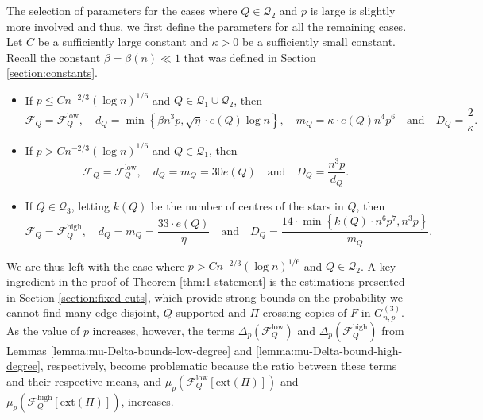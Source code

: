 \documentclass[11pt,a4paper,oneside,reqno]{amsart}
\newcommand{\Gnp}{G_{n, p}^{(3)}}
\newcommand{\cC}{\mathcal{C}}
\newcommand{\cF}{\mathcal{F}}
\newcommand{\cQ}{\mathcal{Q}}
\newcommand{\1}{\mathbbm{1}} %
\renewcommand{\le}{\leqslant}
\newcommand{\cFQL}{\cF_Q^{\mathrm{low}}}
\newcommand{\cFQH}{\cF_Q^{\mathrm{high}}}
\newcommand{\cTFQH}{\Tilde{\cF}_Q^{\mathrm{high}}}
\newcommand{\ext}{\mathrm{ext}}
\begin{document}

The selection of parameters for the cases where $Q \in \cQ_2$ and $p$ is large is slightly more involved and thus, we first define the parameters for all the remaining cases. Let $C$ be a sufficiently large constant and $\kappa > 0$ be a sufficiently small constant. Recall the constant $\beta =\beta(n) \ll 1$ that was defined in Section \ref{section:constants}.
\begin{itemize}
    \item If $p \le C n^{-2/3} \left(\log n\right)^{1/6}$ and $Q \in \cQ_1 \cup \cQ_2$, then
    \[
        \cF_Q = \cFQL, \quad d_Q = \min\left\{\beta n^3 p,\sqrt{\eta} \cdot e(Q) \log n\right\},\quad m_Q = \kappa \cdot e(Q) n^4 p^6 \quad \text{and} \quad D_Q = \frac{2}{\kappa}.
    \]
    \item If $p > C n^{-2/3} \left(\log n\right)^{1/6}$ and $Q \in \cQ_1$, then 
    \[
        \cF_Q = \cFQL,\quad d_Q = m_Q = 30 e(Q) \quad \text{and} \quad D_Q = \frac{n^3 p}{d_Q}.
    \]    
    \item If $Q \in \cQ_3$, letting $k(Q)$ be the number of centres of the stars in $Q$, then
    \[
        \cF_Q = \cFQH,\quad d_Q = m_Q = \frac{33 \cdot e(Q)}{\eta} \quad \text{and} \quad D_Q = \frac{14 \cdot \min\left\{k(Q) \cdot n^6 p^7, n^3 p\right\}}{m_Q}.
    \]    
\end{itemize}

We are thus left with the case where $p > C n^{-2/3} \left(\log n\right)^{1/6}$ and $Q \in \cQ_2$. A key ingredient in the proof of Theorem \ref{thm:1-statement} is the estimations presented in Section \ref{section:fixed-cuts}, which provide strong bounds on the probability we cannot find many edge-disjoint, $Q$-supported and $\Pi$-crossing copies of $F$ in $\Gnp$. As the value of $p$ increases, however, the terms $\Delta_p(\cFQL)$ and $\Delta_p(\cFQH)$ from Lemmas \ref{lemma:mu-Delta-bounds-low-degree} and \ref{lemma:mu-Delta-bound-high-degree}, respectively, become problematic because the ratio between these terms and their respective means, and $\mu_p(\cFQL[\ext(\Pi)])$ and $\mu_p(\cFQH[\ext(\Pi)])$, increases. 
\end{document}
